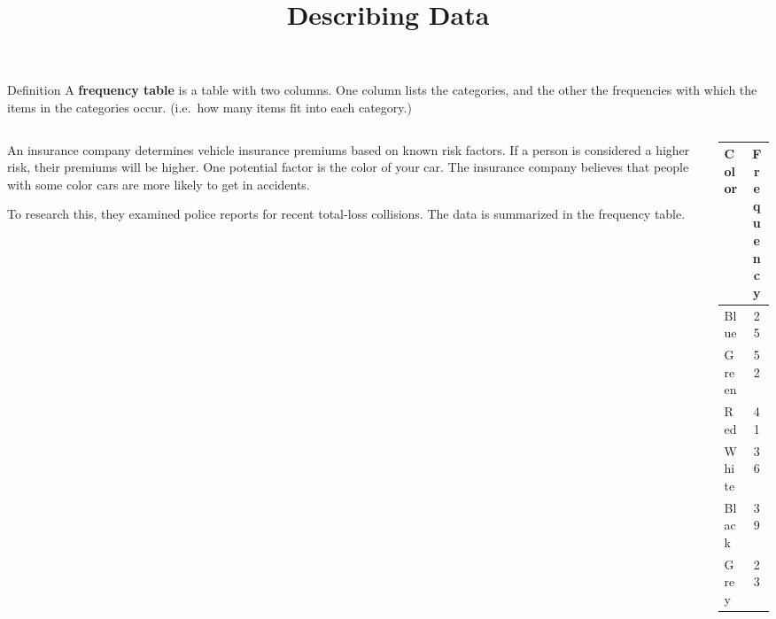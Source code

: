 \documentclass{beamer}
\title[MATH 1030 - Module 8 - Describing Data]{Describing Data}
\begin{document}
\begin{frame}
\titlepage
\end{frame}

\begin{frame}
\begin{block}{Definition}
A \textbf{frequency table} is a table with two columns. One column lists the categories, and the other the frequencies with which the items in the categories occur. (i.e.\ how many items fit into each category.)
\end{block}\pause

\begin{example}\label{ex:carcolor1}
\begin{columns}[c]
\begin{column}{7cm}
An insurance company determines vehicle insurance premiums based on known risk factors. If a person is considered a higher risk, their premiums will be higher. One potential factor is the color of your car. The insurance company believes that people with some color cars are more likely to get in accidents. 

\vspace{2mm}
To research this, they examined police reports for recent total-loss collisions. The data is summarized in the frequency table.
\end{column}
\begin{column}{3.5cm}
\begin{tabular}{|l|c|}
\hline
\textbf{Color} & \textbf{Frequency} \\\hline
Blue & 25 \\\hline
Green & 52 \\\hline
Red & 41 \\\hline
White & 36 \\\hline
Black & 39 \\\hline
Grey & 23 \\\hline
\end{tabular}
\end{column}
\end{columns}
\end{example}
\end{frame}
\end{document}
